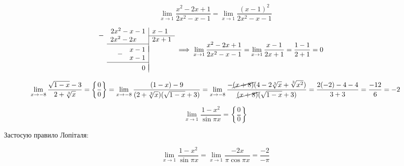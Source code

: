 \documentclass[../rgr1.tex]{subfiles}
\begin{document}
\Solution

\begin{equation}
	\lim_{x\to1}\frac{x^2-2x+1}{2x^2-x-1} =
	\lim_{x\to1}\frac{(x-1)^2}{2x^2-x-1}
\end{equation}

\newcommand{\dropsign}[1]{\smash{\llap{\raisebox{-.5\normalbaselineskip}{$#1$\hspace{2\arraycolsep}}}}}%

\begin{equation}
  \begin{array}{r|r}
	\dropsign{-}
	  	2x^2 - x - 1	& x - 1 \phantom{2} \\ \cline{2-2}
		2x^2 - 2x \phantom{-1}	& 2x+1 \\ \cline{1-1} \\[\dimexpr-\normalbaselineskip+\jot]
	\dropsign{-}
		x-1\\
		x-1 \\ \cline{1-1} \\[\dimexpr-\normalbaselineskip+\jot]
		0
  \end{array} \implies
	\lim_{x\to1}\frac{x^2-2x+1}{2x^2-x-1} =
	\lim_{x\to1}\frac{x-1}{2x+1} =
	\frac{1-1}{2+1} = 0
\end{equation}



\Solution

\begin{dmath}
	\lim_{x\to -8}\frac{ \sqrt{1-x}-3 }{ 2+\sqrt[3]{x} }
	= \left\{ \frac{0}{0} \right\} =
	\lim_{x\to -8}\frac{ (1-x)-9 }{ (2+\sqrt[3]{x})(\sqrt{1-x}+3) } =
	\lim_{x\to -8}\frac{ -\cancel{(x+8)}(4-2\sqrt[3]{x} +\sqrt[3]{x^2}) }{ \cancel{(x+8)}(\sqrt{1-x}+3) } =
	\frac{2(-2) - 4 - 4}{3+3} = \frac{-12}{6} = -2
\end{dmath}


\Solution

\begin{dmath}
	\lim_{x\to 1}\frac{1-x^2}{\sin{\pi x} } =
	\left\{ \frac{0}{0} \right\}
\end{dmath}

Застосую правило Лопіталя:

\begin{dmath}
	\lim_{x\to 1}\frac{1-x^2}{\sin{\pi x} } =
	\lim_{x\to 1}\frac{-2x}{\pi\cos{\pi x} } =
	\frac{-2}{-\pi}
\end{dmath}

\end{document}
